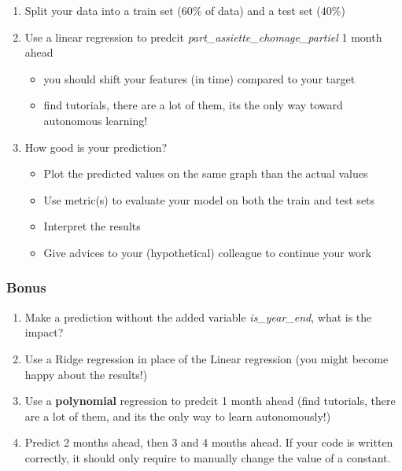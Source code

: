 \begin{enumerate}
    \item Split your data into a train set (60\% of data) and a test set (40\%)
    \item Use a linear regression to predcit \textit{part\_assiette\_chomage\_partiel} 1 month ahead
    \begin{itemize}
        \item you should shift your features (in time) compared to your target
        \item find tutorials, there are a lot of them, its the only way toward autonomous learning!
    \end{itemize}
    \item How good is your prediction?
    \begin{itemize}
        \item Plot the predicted values on the same graph than the actual values
        \item Use metric(s) to evaluate your model on both the train and test sets
        \item Interpret the results
        \item Give advices to your (hypothetical) colleague to continue your work
    \end{itemize}
\end{enumerate}



\subsubsection{Bonus}

\begin{enumerate}
    \item Make a prediction without the added variable \textit{is\_year\_end}, what is the impact?
    \item Use a Ridge regression in place of the Linear regression (you might become happy about the results!)
    \item Use a \textbf{polynomial} regression to predcit 1 month ahead (find tutorials, there are a lot of them, and its the only way to learn autonomously!)
    \item Predict 2 months ahead, then 3 and 4 months ahead. If your code is written correctly, it should only require to manually change the value of a constant.
\end{enumerate}


